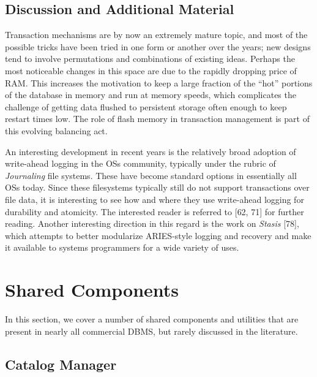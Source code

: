 \documentclass[a4paper,11pt,twoside,openright]{book}
\begin{document}
\hypertarget{discussion-and-additional-material-4}{%
\section{Discussion and Additional
Material}\label{discussion-and-additional-material-4}}

Transaction mechanisms are by now an extremely mature topic, and most of
the possible tricks have been tried in one form or another over the
years; new designs tend to involve permutations and combinations of
existing ideas. Perhaps the most noticeable changes in this space are
due to the rapidly dropping price of RAM. This increases the motivation
to keep a large fraction of the ``hot'' portions of the database in
memory and run at memory speeds, which complicates the challenge of
getting data flushed to persistent storage often enough to keep restart
times low. The role of flash memory in transaction management is part of
this evolving balancing act.

An interesting development in recent years is the relatively broad
adoption of write-ahead logging in the OSs community, typically under
the rubric of \emph{Journaling} file systems. These have become standard
options in essentially all OSs today. Since these filesystems typically
still do not support transactions over file data, it is interesting to
see how and where they use write-ahead logging for durability and
atomicity. The interested reader is referred to {[}62, 71{]} for further
reading. Another interesting direction in this regard is the work on
\emph{Stasis} {[}78{]}, which attempts to better modularize ARIES-style
logging and recovery and make it available to systems programmers for a
wide variety of uses.

\hypertarget{shared-components}{%
\chapter{Shared Components}\label{shared-components}}

In this section, we cover a number of shared components and utilities
that are present in nearly all commercial DBMS, but rarely discussed in
the literature.

\hypertarget{catalog-manager}{%
\section{Catalog Manager}\label{catalog-manager}}
\end{document}
